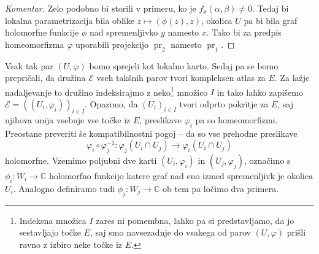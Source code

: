 \documentclass[mat1]{fmfdelo}
\numberwithin{equation}{section}
\newcommand{\C}{\mathbb C}
\newcommand{\inv}{^{-1}}
\DeclareMathOperator{\pr}{pr}
\theoremstyle{definition}
\newenvironment{komentar}[1][Komentar]{\begin{proof}[#1]\let\qed\relax}{\end{proof}}
\begin{document}


\begin{komentar}
    Zelo podobno bi storili v primeru, ko je $f_x(\alpha, \beta) \neq 0$. Tedaj bi lokalna parametrizacija bila oblike $z \mapsto (\phi(z), z)$, okolica $U$ pa bi bila graf holomorfne funkcije $\phi$ nad spremenljivko $y$ namesto $x$. Tako bi za predpis homeomorfizma $\varphi$ uporabili projekcijo $\pr_2$ namesto $\pr_1$.
\end{komentar}

Vsak tak par $(U, \varphi)$ bomo sprejeli kot lokalno karto. 
Sedaj pa se bomo prepričali, da družina $\mathcal{E}$ vseh takšnih parov tvori kompleksen atlas za $E$. Za lažje nadaljevanje to družino indeksirajmo z neko\footnote{Indeksna množica $I$ zares ni pomembna, lahko pa si predstavljamo, da jo sestavljajo točke $E$, saj smo navsezadnje do vsakega od parov $(U, \varphi)$ prišli ravno z izbiro neke točke iz $E$. } množico $I$ in tako lahko zapišemo $\mathcal{E} = ((U_i, \varphi_i))_{i \in I}$. 
Opazimo, da  
$(U_i)_{i \in I}$ tvori odprto pokritje za $E$, saj njihova unija vsebuje vse točke iz $E$, preslikave $\varphi_i$ pa so homeomorfizmi. Preostane preveriti še kompatibilnostni pogoj -- da so vse prehodne preslikave
\[
    \varphi_i \circ \varphi_j\inv : \varphi_j(U_i \cap U_j) \to \varphi_i(U_i \cap U_j)  
\]
holomorfne. Vzemimo poljubni dve karti $(U_i, \varphi_i)$ in $(U_j, \varphi_j)$, označimo s $\phi_i : W_i \to \C$ holomorfno funkcijo katere graf nad eno izmed spremenljivk je okolica $U_i$. Analogno definiramo tudi $\phi_j : W_j \to \C$ ob tem pa ločimo dva primera. 
\end{document}
